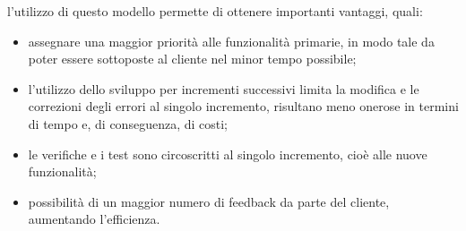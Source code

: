 l'utilizzo di questo modello permette di ottenere importanti vantaggi, quali:
\begin{itemize}
    \item assegnare una maggior priorità alle funzionalità primarie, in modo tale da poter essere sottoposte al cliente nel minor tempo possibile;
    \item l'utilizzo dello sviluppo per incrementi successivi limita la modifica e le correzioni degli errori al singolo incremento, risultano meno onerose in termini di tempo e, di conseguenza, di costi;
    \item le verifiche e i test sono circoscritti al singolo incremento, cioè alle nuove funzionalità;
    \item possibilità di un maggior numero di feedback da parte del cliente, aumentando l'efficienza.
\end{itemize}